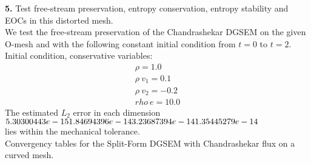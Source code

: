 \documentclass[11pt]{scrartcl}
\begin{document}
\textbf{5.} Test free-stream preservation, entropy conservation, entropy stability and EOCs in this distorted mesh. \\
We test the free-stream preservation of the Chandrashekar DGSEM on the given O-mesh and with the following constant initial condition from $t=0$ to $t=2$.\\
Initial condition, conservative variables:
\begin{align*}
\rho = 1.0 \\
  \rho \ v_1 = 0.1 \\
  \rho \ v_2 = -0.2 \\
  rho \ e = 10.0
\end{align*}
The estimated $L_2$ error in each dimension \\
$ 5.30300443e-15 \\ 1.84694396e-14\\ 3.23687394e-14 \\ 1.35445279e-14$ \\

lies within the mechanical tolerance.\\
Convergency tables for the Split-Form DGSEM with Chandrashekar flux on a curved mesh.
\end{document}
